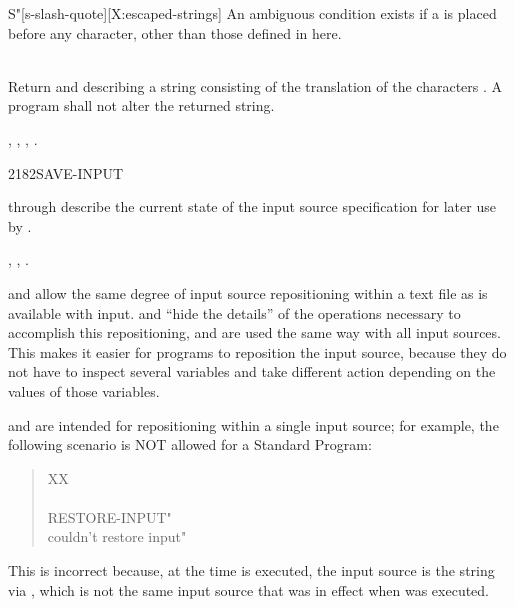 \begin{worddef}[Seq]{}{S\bs"}[s-slash-quote][X:escaped-strings]
	An ambiguous condition exists if a \bs{} is placed before any character,
	other than those defined in here.

\runtime {} \\
	Return  and  describing a string consisting of
	the translation of the characters .  A program shall not
	alter the returned string.

\see {},
	,
	,
	.
\end{worddef}


\begin{worddef}{2182}{SAVE-INPUT}
\item {}

	 through  describe the current state of the
	input source specification for later use by .

\see {}, ,
	  .

	\begin{rationale} %
		 and  allow the same
		degree of input source repositioning within a text file as is
		available with  input. 
		and  ``hide the details'' of the operations
		necessary to accomplish this repositioning, and are used the
		same way with all input sources. This makes it easier for
		programs to reposition the input source, because they do not
		have to inspect several variables and take different action
		depending on the values of those variables.

		 and  are intended for
		repositioning within a single input source; for example, the
		following scenario is NOT allowed for a Standard Program:

		\begin{quote}\ttfamily
			\word{:} XX \\
			\tab {} ~  \\
			\tab {} RESTORE-INPUT"  \\
			\tab {} couldn't restore input" \\
			\word{;}
		\end{quote}

		This is incorrect because, at the time  is
		executed, the input source is the string via ,
		which is not the same input source that was in effect when
		 was executed.


\end{rationale}
\end{worddef}
